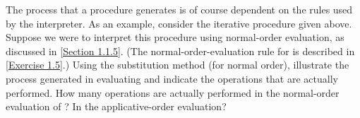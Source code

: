 \begin{exercise}
	\label{Exercise 1.20}
	The process that a procedure generates is of course dependent on the rules used by the interpreter.
	As an example, consider the iterative  procedure given above.
	Suppose we were to interpret this procedure using normal-order evaluation, as discussed in \cref{Section 1.1.5}.
	(The normal-order-evaluation rule for  is described in \cref{Exercise 1.5}.)
	Using the substitution method (for normal order), illustrate the process generated in evaluating  and indicate the  operations that are actually performed.
	How many  operations are actually performed in the normal-order evaluation of ?
	In the applicative-order evaluation?
\end{exercise}
